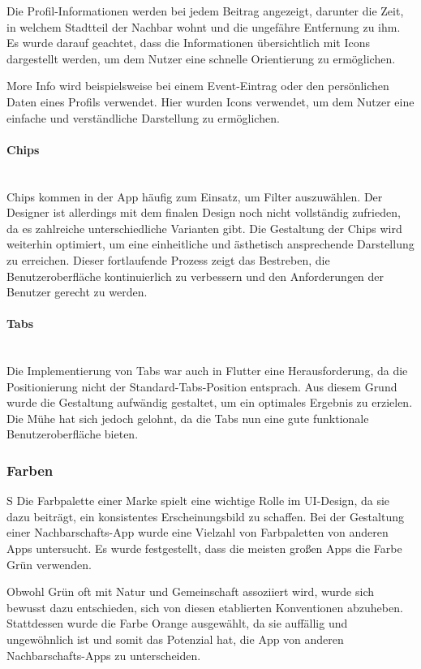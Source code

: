 Die Profil-Informationen werden bei jedem Beitrag angezeigt,
darunter die Zeit, in welchem Stadtteil der Nachbar wohnt
und die ungefähre Entfernung zu ihm. Es wurde darauf
geachtet, dass die Informationen übersichtlich mit
Icons dargestellt werden, um dem Nutzer eine schnelle Orientierung
zu ermöglichen.

More Info wird beispielsweise bei einem Event-Eintrag oder
den persönlichen Daten eines Profils verwendet. Hier wurden
Icons verwendet, um dem Nutzer eine einfache und
verständliche Darstellung zu ermöglichen.

\paragraph{Chips}\mbox{} \\
Chips kommen in der App häufig zum Einsatz, um Filter auszuwählen. Der Designer ist allerdings mit dem finalen Design noch nicht vollständig zufrieden, da es zahlreiche unterschiedliche Varianten gibt. Die Gestaltung der Chips wird weiterhin optimiert, um eine einheitliche und ästhetisch ansprechende Darstellung zu erreichen. Dieser fortlaufende Prozess zeigt das Bestreben, die Benutzeroberfläche kontinuierlich zu verbessern und den Anforderungen der Benutzer gerecht zu werden.

\paragraph{Tabs}\mbox{} \\
Die Implementierung von Tabs war auch in Flutter eine
Herausforderung, da die Positionierung nicht der
Standard-Tabs-Position entsprach. Aus diesem Grund wurde die
Gestaltung aufwändig gestaltet, um ein optimales Ergebnis zu
erzielen. Die Mühe hat sich jedoch gelohnt, da die Tabs nun
eine gute funktionale Benutzeroberfläche bieten.

\subsubsection{Farben}S
Die Farbpalette einer Marke spielt eine wichtige Rolle im UI-Design, da sie dazu beiträgt, ein konsistentes Erscheinungsbild zu schaffen. Bei der Gestaltung einer Nachbarschafts-App wurde eine Vielzahl von Farbpaletten von anderen Apps untersucht. Es wurde festgestellt, dass die meisten großen Apps die Farbe Grün verwenden.

Obwohl Grün oft mit Natur und Gemeinschaft assoziiert wird, wurde sich bewusst dazu entschieden, sich von diesen etablierten Konventionen abzuheben. Stattdessen wurde die Farbe Orange ausgewählt, da sie auffällig und ungewöhnlich ist und somit das Potenzial hat, die App von anderen Nachbarschafts-Apps zu unterscheiden.

